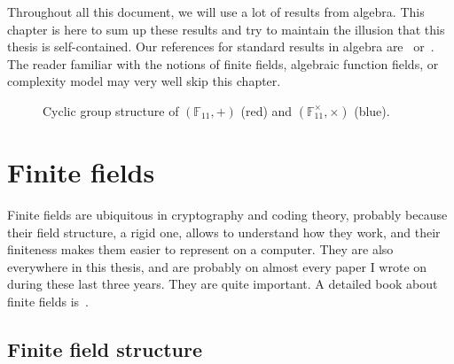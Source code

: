Throughout all this document, we will use a lot of results from algebra. This
chapter is here to sum up these results and try to maintain the illusion that
this thesis is self-contained. Our references for standard results in algebra
are~\cite{Lang04} or~\cite{Perrin96}.
The reader familiar with the notions of finite
fields, algebraic function fields, or complexity model may very well skip this
chapter.
\minitoc

\begin{figure}
  \centering
  \caption{Cyclic group structure of $(\mathbb{F}_{11}, +)$ (red) and
  $(\mathbb{F}_{11}^\times, \times)$ (blue).}
  \label{fig:finite-field}
\end{figure}
 
\clearpage
\section{Finite fields}

Finite fields are ubiquitous in cryptography and coding theory, probably because
their field structure, a rigid one, allows to understand how they work, and
their finiteness makes them easier to represent on a computer. They are also
everywhere in this thesis, and are probably on almost every paper I
wrote on during these last three years. They are quite important. A detailed
book about finite fields is~\cite{LN97}.

\subsection{Finite field structure}

